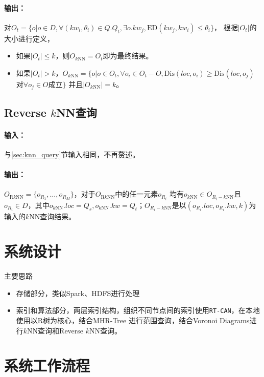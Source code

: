 \documentclass{ML}
\begin{document}
\paragraph{输出：}对$O_t = \{o | o \in D, \forall(kw_i, \theta_i) \in Q.Q_t, \exists o.kw_j, \mathrm{ED}(kw_j, kw_i) \leq \theta_i\}$，
根据$|O_t|$的大小进行定义，
\begin{itemize}
    \item 如果$|O_t| \leq k$，则$O_{k\mathrm{NN}} = O_t$即为最终结果。
    \item 如果$|O_t| > k$，$O_{k\mathrm{NN}}= \{o | o \in O_t, \forall o_i \in O_t - O, \mathrm{Dis}(loc, o_i) \ge \mathrm{Dis}(loc, o_j)$对$\forall o_j \in O$成立$\}$
    并且$|O_{k\mathrm{NN}}| = k$。
\end{itemize}

\subsection{Reverse $k$NN查询}
\paragraph{输入：}与\ref{sec:knn_query}节输入相同，不再赘述。
\paragraph{输出：}$O_{\mathrm{R}k\mathrm{NN}} = \{o_{R_1}, \dots, o_{R_M}\}$，对于$O_{\mathrm{R}k\mathrm{NN}}$中的任一元素$o_{R_i}$
均有$o_{k\mathrm{NN}} \in O_{R_i-k\mathrm{NN}}$且$o_{R_i} \in D$，其中$o_{k\mathrm{NN}}.loc = Q_s, o_{k\mathrm{NN}}.kw = Q_t$；$O_{R_i-k\mathrm{NN}}$是以$(o_{R_i}.loc, o_{R_i}.kw, k)$为输入的$k$NN查询结果。
\section{系统设计}
主要思路\begin{itemize}
    \item 存储部分，类似Spark、HDFS进行处理
    \item 索引和算法部分，两层索引结构，组织不同节点间的索引使用\texttt{RT-CAN}\cite{RT-CAN}，在本地使用以R树为核心，结合MHR-Tree\cite{MHR-Tree}
    进行范围查询，结合Voronoi Diagrams\cite{VoR-Tree}进行$k$NN查询和Reverse $k$NN查询。
\end{itemize}
\section{系统工作流程}
\appendix
\end{document}

